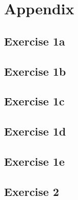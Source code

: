 \chapter{Appendix}

	\section{Exercise 1a}
	\label{app:1a}
	

	\section{Exercise 1b}
	\label{app:1b}
	

	\section{Exercise 1c}
	\label{app:1c}
	

	\section{Exercise 1d}
	\label{app:1d}
	

	\section{Exercise 1e}
	\label{app:1e}
	

	\section{Exercise 2}
	\label{app:2}
	
